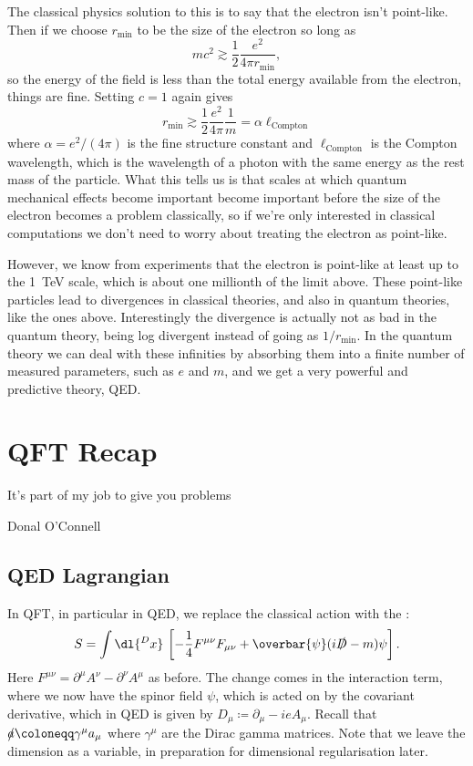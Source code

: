 \documentclass[fleqn]{NotesClass}
\newcommand{\diracadjoint}[1]{\overbar{#1}}
\newcommand{\covariantDerivative}{D}
\begin{document}
    The classical physics solution to this is to say that the electron isn't point-like.
    Then if we choose \(r_{\min}\) to be the size of the electron so long as
    \begin{equation}
        mc^2 \gtrsim \frac{1}{2} \frac{e^2}{4\pi r_{\min}},
    \end{equation}
    so the energy of the field is less than the total energy available from the electron, things are fine.
    Setting \(c = 1\) again gives
    \begin{equation}
        r_{\min} \gtrsim \frac{1}{2} \frac{e^2}{4\pi} \frac{1}{m} = \alpha \ell_{\mathrm{Compton}}
    \end{equation}
    where \(\alpha = e^2/(4\pi)\) is the fine structure constant and \(\ell_{\mathrm{Compton}}\) is the Compton wavelength, which is the wavelength of a photon with the same energy as the rest mass of the particle.
    What this tells us is that scales at which quantum mechanical effects become important become important before the size of the electron becomes a problem classically, so if we're only interested in classical computations we don't need to worry about treating the electron as point-like.
    
    However, we know from experiments that the electron is point-like at least up to the \qty{1}{\tera\electronvolt} scale, which is about one millionth of the limit above.
    These point-like particles lead to divergences in classical theories, and also in quantum theories, like the ones above.
    Interestingly the divergence is actually not as bad in the quantum theory, being log divergent instead of going as \(1/r_{\min}\).
    In the quantum theory we can deal with these infinities by absorbing them into a finite number of measured parameters, such as \(e\) and \(m\), and we get a very powerful and predictive theory, QED.
    
    \chapter{QFT Recap}
    \epigraph{It's part of my job to give you problems}{Donal O'Connell}
    \section{QED Lagrangian}
    In QFT, in particular in QED, we replace the classical action with the :
    \begin{equation}
        S = \int \dl{^Dx} \, \left[ -\frac{1}{4}F^{\mu\nu}F_{\mu\nu} + \diracadjoint{\psi} (i\slashed{\covariantDerivative} - m)\psi \right].
    \end{equation}
    Here \(F^{\mu\nu} = \partial^\mu A^\nu - \partial^\nu A^\mu\) as before.
    The change comes in the interaction term, where we now have the spinor field \(\psi\), which is acted on by the covariant derivative, which in QED is given by \(\covariantDerivative_\mu \coloneqq \partial_\mu -ieA_\mu\).
    Recall that \(\slashed{a} \coloneqq \gamma^\mu a_\mu\) where \(\gamma^\mu\) are the Dirac gamma matrices.
    Note that we leave the dimension as a variable, in preparation for dimensional regularisation later.
    
\end{document}
